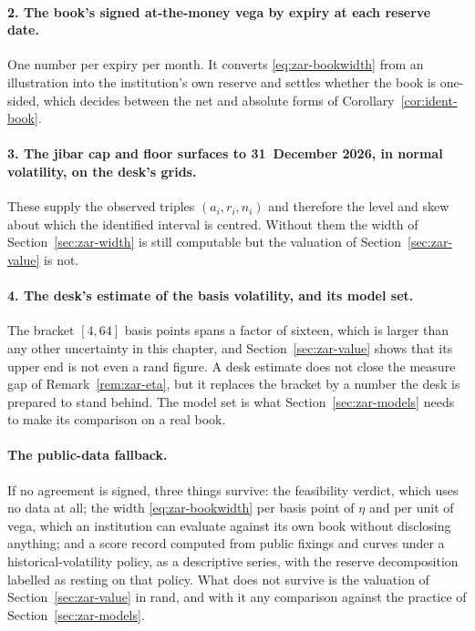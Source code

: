 \documentclass[../../../main.tex]{subfiles}
\begin{document}
\paragraph{2. The book's signed at-the-money vega by expiry at each reserve date.} One number per expiry per month. It converts \eqref{eq:zar-bookwidth} from an illustration into the institution's own reserve and settles whether the book is one-sided, which decides between the net and absolute forms of Corollary~\ref{cor:ident-book}.

\paragraph{3. The \gls{jibar} cap and floor surfaces to 31~December 2026, in normal volatility, on the desk's grids.} These supply the observed triples $(a_i,r_i,n_i)$ and therefore the level and skew about which the identified interval is centred. Without them the width of Section~\ref{sec:zar-width} is still computable but the valuation of Section~\ref{sec:zar-value} is not.

\paragraph{4. The desk's estimate of the basis volatility, and its model set.} The bracket $[4,64]$ basis points spans a factor of sixteen, which is larger than any other uncertainty in this chapter, and Section~\ref{sec:zar-value} shows that its upper end is not even a rand figure. A desk estimate does not close the measure gap of Remark~\ref{rem:zar-eta}, but it replaces the bracket by a number the desk is prepared to stand behind. The model set is what Section~\ref{sec:zar-models} needs to make its comparison on a real book.

\paragraph{The public-data fallback.} If no agreement is signed, three things survive: the feasibility verdict, which uses no data at all; the width \eqref{eq:zar-bookwidth} per basis point of $\eta$ and per unit of vega, which an institution can evaluate against its own book without disclosing anything; and a score record computed from public fixings and curves under a historical-volatility policy, as a descriptive series, with the reserve decomposition labelled as resting on that policy. What does not survive is the valuation of Section~\ref{sec:zar-value} in rand, and with it any comparison against the practice of Section~\ref{sec:zar-models}.
\end{document}
